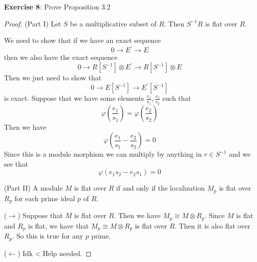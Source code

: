 \documentclass{article}
\begin{document}
\textbf{Exercise 8}: Prove Proposition 3.2
    \begin{proof}
        (Part I) Let $S$ be a multiplicative subset of $R$. Then $S^{-1}R$ is flat over $R$.

        We need to show that if we have an exact sequence
            \begin{equation*}
                0 \rightarrow E^{\prime} \rightarrow E
            \end{equation*}
        then we also have the exact sequence
            \begin{equation*}
                0 \rightarrow R[S^{-1}] \otimes E^{\prime} \rightarrow R[S^{-1}] \otimes E
            \end{equation*}
        Then we just need to show that 
            \begin{equation*}
                0 \rightarrow E[S^{-1}] \rightarrow E^{\prime}[S^{-1}]
            \end{equation*}
        is exact. Suppose that we have some elements $\frac{e_{1}}{s_{1}}, \frac{e_{2}}{s_{2}}$ such that 
            \begin{equation*}
                \varphi(\dfrac{e_{1}}{s_{1}}) = \varphi(\dfrac{e_{2}}{s_{2}})
            \end{equation*}
        Then we have
            \begin{equation*}
                \varphi(\dfrac{e_{1}}{s_{1}} - \dfrac{e_{2}}{s_{2}}) = 0
            \end{equation*}
        Since this is a module morphism we can multiply by anything in $r \in S^{-1}$ and we see that 
            \begin{equation*}
                \varphi(e_{1}s_{2} - e_{2}s_{1}) = 0
            \end{equation*}

        (Part II) A module $M$ is flat over $R$ if and only if the localization $M_{p}$ is flat over $R_{p}$ for each prime ideal $p$ of $R$.

        ($\rightarrow$) Suppose that $M$ is flat over $R$. Then we have $M_{p} \cong M  \otimes R_{p}$. Since $M$ is flat and $R_{p}$ is flat, we have that $M_{p} \cong M \otimes R_{p}$ is flat over $R$. Then it is also flat over $R_{p}$. So this is true for any $p$ prime.

        ($\leftarrow$) Idk < Help needed.


\end{proof}
\end{document}
